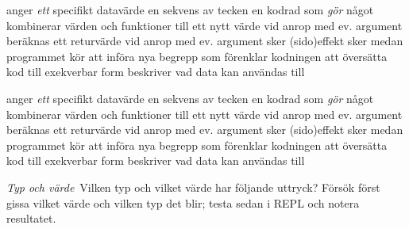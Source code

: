 \begin{ConceptConnections}[0.15\textwidth]
       {anger \emph{ett} specifikt datavärde}
         {en sekvens av tecken}
           {en kodrad som \emph{gör} något}
        {kombinerar värden och funktioner till ett nytt värde}
       {vid anrop med ev. argument beräknas ett returvärde}
       {vid anrop med ev. argument sker (sido)effekt}
 {sker medan programmet kör}
     {att införa nya begrepp som förenklar kodningen}
      {att översätta kod till exekverbar form}
            {beskriver vad data kan användas till}
\end{ConceptConnections}

\SOLUTION

\TaskSolved \what

\begin{ConceptConnections}[0\textwidth]
       {anger \emph{ett} specifikt datavärde}
         {en sekvens av tecken}
           {en kodrad som \emph{gör} något}
        {kombinerar värden och funktioner till ett nytt värde}
       {vid anrop med ev. argument beräknas ett returvärde}
       {vid anrop med ev. argument sker (sido)effekt}
 {sker medan programmet kör}
     {att införa nya begrepp som förenklar kodningen}
      {att översätta kod till exekverbar form}
            {beskriver vad data kan användas till}
\end{ConceptConnections}

\QUESTEND





\clearpage

\ExtraTasks



\def\what{\emph{Typ och värde}}

\QUESTBEGIN

\Task \what~Vilken typ och vilket värde har följande uttryck?  Försök först gissa vilket värde och vilken typ det blir; testa sedan i REPL och notera resultatet.

\Subtask {}

